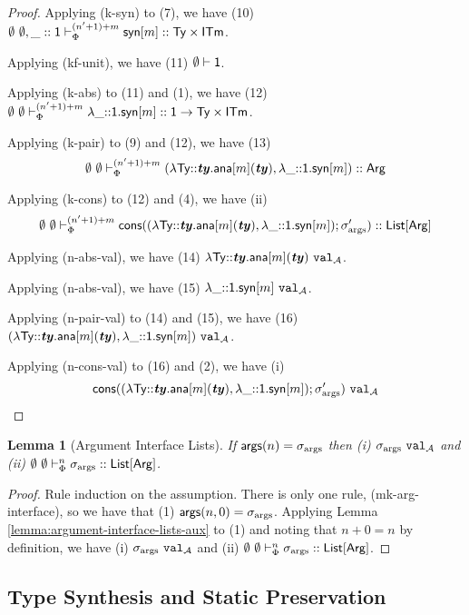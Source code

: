 \documentclass[12pt]{article}
\newtheorem{lemma}{Lemma}
\begin{document}
\begin{proof}
Applying (k-syn) to (7), we have (10) $\emptyset~\emptyset, \_ :: {\sf 1} \vdash_{\Phi}^{(n' + 1) + m} {\sf syn}[m] :: {\sf Ty}\times{\sf ITm}$.

Applying (kf-unit), we have (11) $\emptyset \vdash {\sf 1}$.

Applying (k-abs) to (11) and (1), we have (12) $\emptyset~\emptyset \vdash_{\Phi}^{(n' + 1) + m} \lambda \_{::}{\sf 1}.{\sf syn}[m] :: {\sf 1} \rightarrow {\sf Ty}\times{\sf ITm}$.

Applying (k-pair) to (9) and (12), we have (13) $$\emptyset~\emptyset \vdash_{\Phi}^{(n' + 1) + m} (\lambda {\sf Ty}{::}{\textbf{\textit{ty}}}.{\sf ana}[m]({\textbf{\textit{ty}}}), \lambda \_{::}{\sf 1}.{\sf syn}[m]) :: {\sf Arg}$$

Applying (k-cons) to (12) and (4), we have (ii)  $$\emptyset~\emptyset \vdash_{\Phi}^{(n' + 1) + m} {\sf cons}((\lambda {\sf Ty}{::}{\textbf{\textit{ty}}}.{\sf ana}[m]({\textbf{\textit{ty}}}), \lambda \_{::}{\sf 1}.{\sf syn}[m]); \sigma_\text{args}') :: {\sf List}[{\sf Arg}]$$

Applying (n-abs-val), we have (14) $\lambda {\sf Ty}{::}{\textbf{\textit{ty}}}.{\sf ana}[m]({\textbf{\textit{ty}}})~\mathtt{val}_{\mathcal{A}}$. 

Applying (n-abs-val), we have (15) $\lambda \_{::}{\sf 1}.{\sf syn}[m]~\mathtt{val}_{\mathcal{A}}$.

Applying (n-pair-val) to (14) and (15), we have (16) $(\lambda {\sf Ty}{::}{\textbf{\textit{ty}}}.{\sf ana}[m]({\textbf{\textit{ty}}}), \lambda \_{::}{\sf 1}.{\sf syn}[m])~\mathtt{val}_{\mathcal{A}}$.

Applying (n-cons-val) to (16) and (2), we have (i) $${\sf cons}((\lambda {\sf Ty}{::}{\textbf{\textit{ty}}}.{\sf ana}[m]({\textbf{\textit{ty}}}), \lambda \_{::}{\sf 1}.{\sf syn}[m]); \sigma_\text{args}')~\mathtt{val}_{\mathcal{A}}$$
\end{proof}

\begin{lemma}[Argument Interface Lists]
\label{lemma:argument-interface-lists}
If ${\sf args}(n)=\sigma_\text{args}$ then (i) $\sigma_\text{args}~\mathtt{val}_{\mathcal{A}}$ and (ii) $\emptyset~\emptyset \vdash_{\Phi}^{n} \sigma_\text{args} :: {\sf List}[{\sf Arg}]$.
\end{lemma}
\begin{proof} Rule induction on the assumption. There is only one rule, (mk-arg-interface), so we have that (1) ${\sf args}(n, 0)=\sigma_\text{args}$. Applying Lemma \ref{lemma:argument-interface-lists-aux} to (1) and noting that $n+0=n$ by definition, we have (i) $\sigma_\text{args}~\mathtt{val}_{\mathcal{A}}$ and (ii) $\emptyset~\emptyset \vdash_{\Phi}^{n} \sigma_\text{args} :: {\sf List}[{\sf Arg}]$.
\end{proof}


\subsection{Type Synthesis and Static Preservation}\label{sec:type-synthesis-and-kind-safety}
\end{document}
